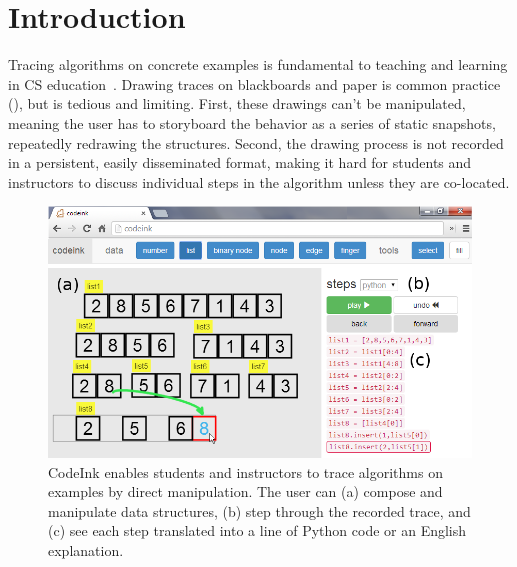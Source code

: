 \section{Introduction}

Tracing algorithms on concrete examples is fundamental to teaching and learning
in CS education~\cite{Lister2004}. Drawing traces on blackboards and paper is
common practice (), 
but is tedious and limiting. First, these 
drawings can't be manipulated, meaning the user has to storyboard the behavior as a series of static
snapshots, repeatedly redrawing the structures. Second, the drawing process is not recorded in a persistent, easily disseminated format,
making it hard for students and instructors to discuss individual steps in
the algorithm unless they are co-located.


\begin{figure}

\begin{center}
\includegraphics[width=\columnwidth]{img/frontpage-mergesort.png}
\end{center}

\caption{CodeInk enables students and instructors to trace algorithms on
examples by direct manipulation. The user can (a) compose and manipulate
data structures, (b) step through the recorded trace, and (c) see each
step translated into a line of Python code or an English explanation.}

\label{fig:codeink-intro}
\end{figure}


